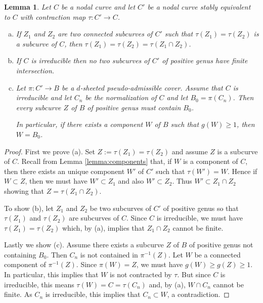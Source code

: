\documentclass{article}
\newtheorem{lemma}[theorem]{Lemma}
\renewcommand{\:}{\colon }
\begin{document}
\begin{lemma}\label{lem:3lemas}
Let $C$ be a nodal curve and let ${C}'$ be a nodal curve stably equivalent to $C$ with contraction map $\tau: {C}'\rightarrow C$. 
\begin{enumerate}[(a)]
\item If $Z_1$ and $Z_2$ are two connected subcurves of ${C}'$ such that $\tau(Z_1)= \tau(Z_2)$ is a subcurve of $C$, then $\tau(Z_1)= \tau(Z_2)= \tau(Z_1\cap Z_2)$.
\item If $C$ is irreducible then no two subcurves of ${C}'$ of positive genus have finite intersection.
\item Let $\pi: {C}' \rightarrow B$ be a $d$-sheeted  pseudo-admissible cover.
Assume that $C$ is irreducible and let $C_n$ be the normalization of $C$  and let $B_0 = \pi(C_n)$. Then every subcurve $Z$ of $B$ of positive genus must contain $B_0$.

In particular, if there exists a component $W$ of $B$ such that $g(W)\geq 1$, then $W=B_0$.
\end{enumerate}
\end{lemma}
\begin{proof}
First we prove (a). Set $Z:=\tau(Z_1)=\tau(Z_2)$ and assume $Z$ is a subcurve of $C$.
Recall from Lemma \ref{lemma:components} that, if $W$ is a component of $C$, 
then there exists an unique component $W'$ of $C'$ such that $\tau(W')=W$. Hence if $W\subset Z$, then we must have $W'\subset Z_1$ and also $W'\subset Z_2$.
Thus $W'\subset Z_1\cap Z_2$ showing that $Z=\tau(Z_1\cap Z_2)$. 

To show (b), let $Z_1$ and $Z_2$ be two subcurves of  ${C}'$ of positive genus
so that $\tau(Z_1)$ and $\tau(Z_2)$ are subcurves of $C$. 
Since $C$ is irreducible, we must have 
$\tau(Z_1)= \tau(Z_2)$ which, by (a), implies that $Z_1\cap Z_2$ cannot be finite.  

    
Lastly we show (c).
Assume there exists a subcurve $Z$ of $B$ of positive genus not containing $B_0$. 
Then $C_n$ is not contained in $\pi^{-1}(Z)$. 
Let $W$ be a connected component of $\pi^{-1}(Z)$. 
Since $\pi(W)=Z$, we must have 
$g(W)\geq g(Z)\geq 1$. 
In particular, this implies that $W$ is not contracted by $\tau$. 
But since $C$ is irreducible, this means $\tau(W)=C=\tau(C_n)$ and, by (a), $W\cap C_n$ cannot be finite.  As $C_n$ is irreducible, this implies that $C_n\subset W$, a contradiction.
\end{proof}
\end{document}
